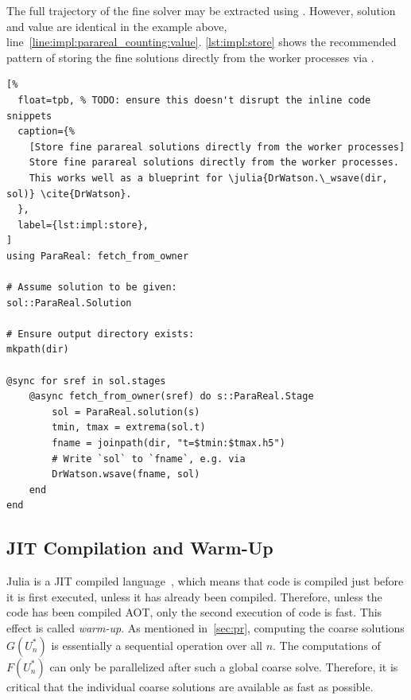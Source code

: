 The full trajectory of the fine solver may be extracted using .
However, solution and value are identical in the example above,
\cf line~\ref{line:impl:parareal_counting:value}.
\autoref{lst:impl:store} shows the recommended pattern of
storing the fine solutions directly from the worker processes
via .

\begin{lstlisting}[%
  float=tpb, % TODO: ensure this doesn't disrupt the inline code snippets
  caption={%
    [Store fine parareal solutions directly from the worker processes]
    Store fine parareal solutions directly from the worker processes.
    This works well as a blueprint for \julia{DrWatson.\_wsave(dir, sol)} \cite{DrWatson}.
  },
  label={lst:impl:store},
]
using ParaReal: fetch_from_owner

# Assume solution to be given:
sol::ParaReal.Solution

# Ensure output directory exists:
mkpath(dir)

@sync for sref in sol.stages
    @async fetch_from_owner(sref) do s::ParaReal.Stage
        sol = ParaReal.solution(s)
        tmin, tmax = extrema(sol.t)
        fname = joinpath(dir, "t=$tmin:$tmax.h5")
        # Write `sol` to `fname`, e.g. via
        DrWatson.wsave(fname, sol)
    end
end
\end{lstlisting}

\subsection{JIT Compilation and Warm-Up}

Julia is a \ac{JIT} compiled language~\cite{Julia},
which means that code is compiled just before it is first executed,
unless it has already been compiled.
Therefore, unless the code has been compiled \ac{AOT},
only the second execution of code is fast.
This effect is called \emph{warm-up}.
As mentioned in~\autoref{sec:pr}, computing the coarse solutions
$G(U_n^*)$ is essentially a sequential operation over all $n$.
The computations of $F(U^*_n)$ can only be parallelized after such a global coarse solve.
Therefore, it is critical that the individual coarse solutions are available as fast as possible.


